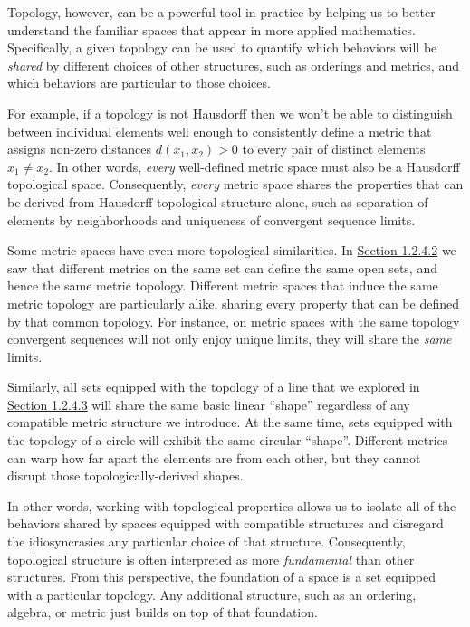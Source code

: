 \documentclass[
  letterpaper,
  DIV=11,
  numbers=noendperiod]{scrartcl}
\begin{document}
Topology, however, can be a powerful tool in practice by helping us to
better understand the familiar spaces that appear in more applied
mathematics. Specifically, a given topology can be used to quantify
which behaviors will be \emph{shared} by different choices of other
structures, such as orderings and metrics, and which behaviors are
particular to those choices.

For example, if a topology is not Hausdorff then we won't be able to
distinguish between individual elements well enough to consistently
define a metric that assigns non-zero distances \(d(x_{1}, x_{2}) > 0\)
to every pair of distinct elements \(x_{1} \ne x_{2}\). In other words,
\emph{every} well-defined metric space must also be a Hausdorff
topological space. Consequently, \emph{every} metric space shares the
properties that can be derived from Hausdorff topological structure
alone, such as separation of elements by neighborhoods and uniqueness of
convergent sequence limits.

Some metric spaces have even more topological similarities. In
\hyperref[sec:open-sets]{Section 1.2.4.2} we saw that different metrics
on the same set can define the same open sets, and hence the same metric
topology. Different metric spaces that induce the same metric topology
are particularly alike, sharing every property that can be defined by
that common topology. For instance, on metric spaces with the same
topology convergent sequences will not only enjoy unique limits, they
will share the \emph{same} limits.

Similarly, all sets equipped with the topology of a line that we
explored in \hyperref[sec:general-topology]{Section 1.2.4.3} will share
the same basic linear ``shape'' regardless of any compatible metric
structure we introduce. At the same time, sets equipped with the
topology of a circle will exhibit the same circular ``shape''. Different
metrics can warp how far apart the elements are from each other, but
they cannot disrupt those topologically-derived shapes.

In other words, working with topological properties allows us to isolate
all of the behaviors shared by spaces equipped with compatible
structures and disregard the idiosyncrasies any particular choice of
that structure. Consequently, topological structure is often interpreted
as more \emph{fundamental} than other structures. From this perspective,
the foundation of a space is a set equipped with a particular topology.
Any additional structure, such as an ordering, algebra, or metric just
builds on top of that foundation.
\end{document}
